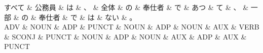 \documentclass[tikz,border=5pt]{standalone}
\begin{document}
\normalsize
\begin{dependency}[edge unit distance=12.0pt]
    \begin{deptext}[column sep=1em]
        すべて \& 公務員 \& は \& 、 \& 全体 \& の \& 奉仕者 \& で \& あつ \& て \& 、 \& 一部 \& の \& 奉仕者 \& で \& は \& ない \& 。\\
        ADV \& NOUN \& ADP \& PUNCT \& NOUN \& ADP \& NOUN \& AUX \& VERB \& SCONJ \& PUNCT \& NOUN \& ADP \& NOUN \& AUX \& ADP \& AUX \& PUNCT\\
    \end{deptext}
\end{dependency}
\end{document}
